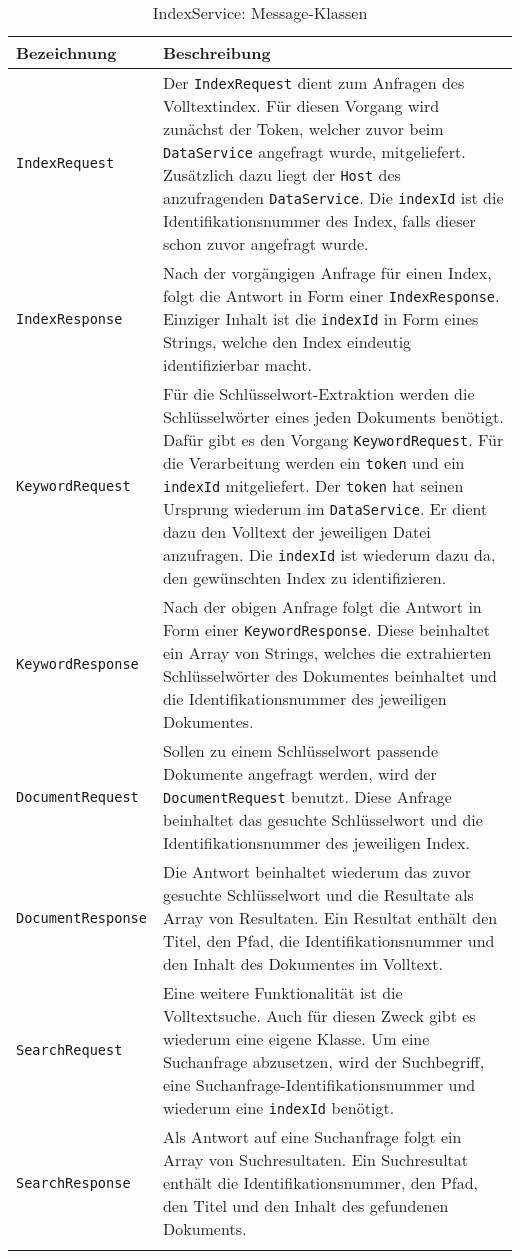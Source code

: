 \begin{longtable}{|p{4cm}| p{8cm}|}
  \hline
    \textbf{Bezeichnung} & \textbf{Beschreibung}\\\hline
    \texttt{IndexRequest} & Der \texttt{IndexRequest} dient zum Anfragen des Volltextindex. Für diesen Vorgang wird zunächst der \gls{Token}, welcher zuvor beim \texttt{DataService} angefragt wurde, mitgeliefert. Zusätzlich dazu liegt der \texttt{Host} des anzufragenden \texttt{DataService}. Die \texttt{indexId} ist die Identifikationsnummer des Index, falls dieser schon zuvor angefragt wurde.\\\hline
    \texttt{IndexResponse} & Nach der vorgängigen Anfrage für einen Index, folgt die Antwort in Form einer \texttt{IndexResponse}. Einziger Inhalt ist die \texttt{indexId} in Form eines Strings, welche den Index eindeutig identifizierbar macht.\\\hline
    \texttt{KeywordRequest} & Für die Schlüsselwort-Extraktion werden die Schlüsselwörter eines jeden Dokuments benötigt. Dafür gibt es den Vorgang \texttt{KeywordRequest}. Für die Verarbeitung werden ein \texttt{token} und ein \texttt{indexId} mitgeliefert. Der \texttt{token} hat seinen Ursprung wiederum im \texttt{DataService}. Er dient dazu den Volltext der jeweiligen Datei anzufragen. Die \texttt{indexId} ist wiederum dazu da, den gewünschten Index zu identifizieren.\\\hline
    \texttt{KeywordResponse} & Nach der obigen Anfrage folgt die Antwort in Form einer \texttt{KeywordResponse}. Diese beinhaltet ein Array von Strings, welches die extrahierten Schlüsselwörter des Dokumentes beinhaltet und die Identifikationsnummer des jeweiligen Dokumentes.\\\hline
    \texttt{DocumentRequest} & Sollen zu einem Schlüsselwort passende Dokumente angefragt werden, wird der \texttt{DocumentRequest} benutzt. Diese Anfrage beinhaltet das gesuchte Schlüsselwort und die Identifikationsnummer des jeweiligen Index.\\\hline
    \texttt{DocumentResponse} & Die Antwort beinhaltet wiederum das zuvor gesuchte Schlüsselwort und die Resultate als Array von Resultaten. Ein Resultat enthält den Titel, den Pfad, die Identifikationsnummer und den Inhalt des Dokumentes im Volltext.\\\hline
    \texttt{SearchRequest} & Eine weitere Funktionalität ist die Volltextsuche. Auch für diesen Zweck gibt es wiederum eine eigene Klasse. Um eine Suchanfrage abzusetzen, wird der Suchbegriff, eine Suchanfrage-Identifikationsnummer und wiederum eine \texttt{indexId} benötigt.\\\hline
    \texttt{SearchResponse} & Als Antwort auf eine Suchanfrage folgt ein Array von Suchresultaten. Ein Suchresultat enthält die Identifikationsnummer, den Pfad, den Titel und den Inhalt des gefundenen Dokuments.\\\hline
        \caption{IndexService: Message-Klassen}
    \label{indexservice-bodies}
\end{longtable}

